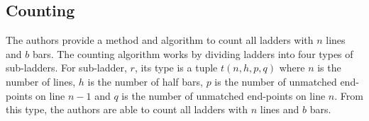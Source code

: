 

\subsection{Counting}
The authors provide a method and algorithm to count all ladders 
with $n$ lines and $b$ bars. The counting algorithm 
works by dividing ladders into four types of sub-ladders.
For sub-ladder, $r$, its type is a tuple $t(n,h,p,q)$ where 
$n$ is the number of lines, $h$ is the number of half bars, 
$p$ is the number of unmatched end-points on line $n-1$ and 
$q$ is the number of unmatched end-points on line $n$. From this 
type, the authors are able to count all ladders with $n$ lines and $b$ bars. 


